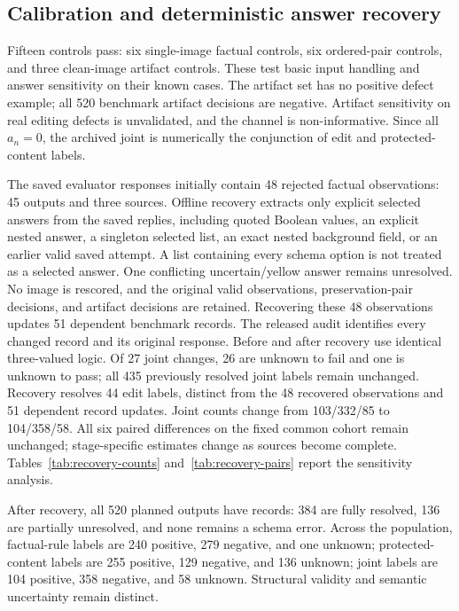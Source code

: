 \subsection{Calibration and deterministic answer recovery}
Fifteen controls pass: six single-image factual controls, six ordered-pair controls, and three clean-image artifact controls. These test basic input handling and answer sensitivity on their known cases. The artifact set has no positive defect example; all 520 benchmark artifact decisions are negative. Artifact sensitivity on real editing defects is unvalidated, and the channel is non-informative. Since all $a_n=0$, the archived joint is numerically the conjunction of edit and protected-content labels.

The saved evaluator responses initially contain 48 rejected factual observations: 45 outputs and three sources. Offline recovery extracts only explicit selected answers from the saved replies, including quoted Boolean values, an explicit nested answer, a singleton selected list, an exact nested background field, or an earlier valid saved attempt. A list containing every schema option is not treated as a selected answer. One conflicting uncertain/yellow answer remains unresolved. No image is rescored, and the original valid observations, preservation-pair decisions, and artifact decisions are retained. Recovering these 48 observations updates 51 dependent benchmark records. The released audit identifies every changed record and its original response. Before and after recovery use identical three-valued logic. Of 27 joint changes, 26 are unknown to fail and one is unknown to pass; all 435 previously resolved joint labels remain unchanged. Recovery resolves 44 edit labels, distinct from the 48 recovered observations and 51 dependent record updates. Joint counts change from 103/332/85 to 104/358/58. All six paired differences on the fixed common cohort remain unchanged; stage-specific estimates change as sources become complete. Tables~\ref{tab:recovery-counts} and~\ref{tab:recovery-pairs} report the sensitivity analysis.



After recovery, all 520 planned outputs have records: 384 are fully resolved, 136 are partially unresolved, and none remains a schema error. Across the population, factual-rule labels are 240 positive, 279 negative, and one unknown; protected-content labels are 255 positive, 129 negative, and 136 unknown; joint labels are 104 positive, 358 negative, and 58 unknown. Structural validity and semantic uncertainty remain distinct.

